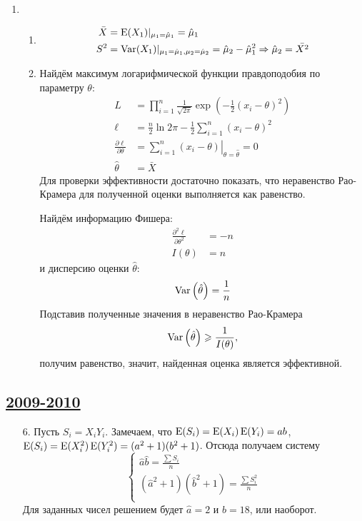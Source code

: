 \begin{enumerate}
\item
\begin{enumerate}
\item
\begin{align*}
\bar X &= \operatorname{E}(X_1) |_{\mu_1 = \hat{\mu}_1} = \hat{\mu}_1 \\
S^2 &= \operatorname{Var}(X_1) |_{\mu_1 = \hat{\mu}_1, \mu_2= \hat{\mu}_2} = \hat{\mu}_2 - \hat{\mu}_1^2 \Rightarrow \hat{\mu}_2 = \bar{X^2}
\end{align*}
\item Найдём максимум логарифмической функции правдоподобия по параметру $\theta$:
\begin{align*}
L &= \prod_{i=1}^n \frac{1}{\sqrt{2\pi}} \exp \left(-\frac{1}{2} (x_i - \theta)^2\right) \\
\ell &= \frac{n}{2} \ln 2\pi - \frac{1}{2} \sum_{i=1}^n (x_i - \theta)^2 \\
\frac{\partial \ell}{\partial \theta} &= \left. \sum_{i=1}^n (x_i - \theta) \right|_{\theta = \hat \theta} = 0 \\
\hat \theta &= \bar X
\end{align*}
Для проверки эффективности достаточно показать, что неравенство Рао-Крамера
для полученной оценки выполняется как равенство.

Найдём информацию Фишера:
\begin{align*}
\frac{\partial^2 \ell}{\partial \theta^2} &= -n \\
I(\theta) &= n
\end{align*}
и дисперсию оценки $\hat \theta$:
\[
\operatorname{Var}\left(\hat \theta \right) = \frac{1}{n}
\]
Подставив полученные значения в неравенство Рао-Крамера
\[
\operatorname{Var}\left(\hat \theta \right) \geqslant \frac{1}{I(\theta)},
\]
получим равенство, значит, найденная оценка является эффективной.
\end{enumerate}
\end{enumerate}

\subsection[2009-2010]{\hyperref[sec:kr_03_2009_2010]{2009-2010}}
\label{sec:sol_kr_03_2009_2010}


\begin{enumerate}
  \item[6.] Пусть $S_i = X_i Y_i$. Замечаем, что $\operatorname{E}(S_i)=\operatorname{E}(X_i)\operatorname{E}(Y_i)=ab$, $\operatorname{E}(S_i)=\operatorname{E}(X_i^2)\operatorname{E}(Y_i^2)=(a^2+1)(b^2+1)$. Отсюда получаем систему
  \[
  \begin{cases}
  \hat a \hat b = \frac{\sum S_i}{n} \\
  (\hat a^2 + 1) (\hat b^2 + 1) = \frac{\sum S_i^2}{n} \\
  \end{cases}
  \]
  Для заданных чисел решением будет $\hat a = 2$ и $\hat b = 18$, или наоборот.
\end{enumerate}


